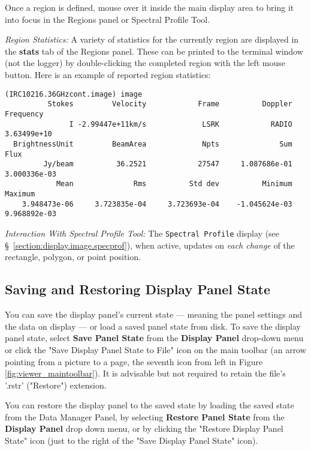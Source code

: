 Once a region is defined, mouse over it inside the main display area to bring it into focus in the Regions panel or Spectral Profile Tool.

{\em Region Statistics:} A variety of statistics for the currently region are displayed in the {\bf stats} tab of the Regions panel. These can
be printed to the terminal window (not the logger) by double-clicking the completed region with the left mouse button. Here is an example of 
reported region statistics:

\small
\begin{verbatim}
(IRC10216.36GHzcont.image) image
          Stokes         Velocity            Frame          Doppler        Frequency 
               I -2.99447e+11km/s             LSRK            RADIO      3.63499e+10 
  BrightnessUnit         BeamArea             Npts              Sum             Flux 
         Jy/beam          36.2521            27547     1.087686e-01     3.000336e-03 
            Mean              Rms          Std dev          Minimum          Maximum 
    3.948473e-06     3.723835e-04     3.723693e-04    -1.045624e-03     9.968892e-03 

\end{verbatim}
\normalsize

{\em Interaction With Spectral Profile Tool:} The {\tt Spectral Profile} display (see \S~\ref{section:display.image.specprof}), when active, 
updates on {\em each change} of the rectangle, polygon, or point position. 


\subsection{Saving and Restoring Display Panel State}
\label{section:display.viewerGUI.save-restore}

You can save the display panel's current state --- meaning the 
panel settings and the data on display --- or load a saved panel
state from disk. To save the display panel state, select {\bf Save Panel State}
from the {\bf Display Panel} drop-down menu or click the 
"Save Display Panel State to File" icon on the main toolbar 
(an arrow pointing from a picture to a page, the seventh icon from left in Figure
\ref{fig:viewer_maintoolbar}). It is advisable but not required to retain the file's '.rstr' ("Restore")
extension.

You can restore the display panel to the saved state by loading the saved
state from the Data Manager Panel, by selecting {\bf Restore Panel State}
from the {\bf Display Panel} drop down menu, or by clicking the "Restore Display Panel State"
icon (just to the right of the "Save Display Panel State" icon).

